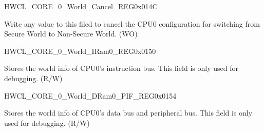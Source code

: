 \begin{register}{H}{WCL\_CORE\_0\_World\_Cancel\_REG}{0x014C}\label{regdesc:WCLCORE0WORLDCANCELREG}
%
\regnewline%
\begin{regdesc}\begin{reglist}
\label{fielddesc:WCLCORE0WORLDCANCEL}\item [WCL\_CORE\_0\_WORLD\_CANCEL] Write any value to this filed to cancel the CPU0 configuration for switching from Secure World to Non-Secure World. (WO)
\end{reglist}\end{regdesc}
\end{register}


\begin{register}{H}{WCL\_CORE\_0\_World\_IRam0\_REG}{0x0150}\label{regdesc:WCLCORE0WORLDIRAM0REG}
%
%
\regnewline%
\begin{regdesc}\begin{reglist}
\label{fielddesc:WCLCORE0WORLDIRAM0}\item [WCL\_CORE\_0\_WORLD\_IRAM0] Stores the world info of CPU0's instruction bus. This field is only used for debugging. (R/W)
\end{reglist}\end{regdesc}
\end{register}


\begin{register}{H}{WCL\_CORE\_0\_World\_DRam0\_PIF\_REG}{0x0154}\label{regdesc:WCLCORE0WORLDDRAM0PIFREG}
%
%
\regnewline%
\begin{regdesc}\begin{reglist}
\label{fielddesc:WCLCORE0WORLDDRAM0PIF}\item [WCL\_CORE\_0\_WORLD\_DRAM0\_PIF] Stores the world info of CPU0's data bus and peripheral bus. This field is only used for debugging. (R/W)
\end{reglist}\end{regdesc}
\end{register}



